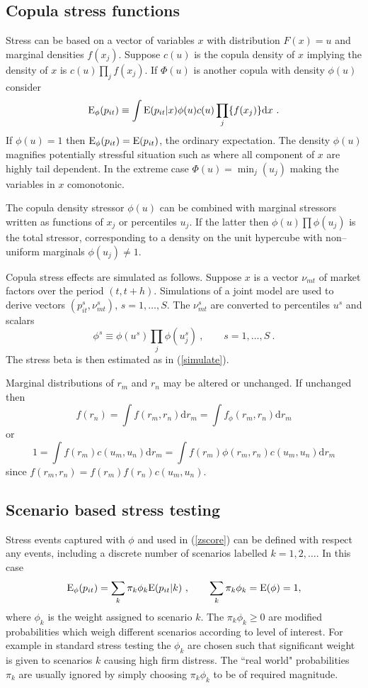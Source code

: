 \documentclass[authoryear]{elsarticle}
\newcommand{\E}{\mathrm{E}}
\newcommand{\de}{\mathrm{d}}
\newcommand{\eref}[1]{(\ref{#1})}
\newcommand{\cq}{\ , \qquad}
\newcommand{\be}[1]{\begin{equation}\label{#1}}
\newcommand{\ee}{\end{equation}}
\begin{document}
\subsection{Copula stress functions}


Stress can be based on a vector of variables $x$ with distribution $F(x)=u$ and marginal densities $f(x_j)$.    Suppose $c(u)$ is the copula density of $x$ implying the density of $x$ is $c(u)\prod_jf(x_j)$.    If  $\Phi(u)$ is another copula with density $\phi(u)$ 
consider
\be{copula}
\Es(p_{it}) \equiv \int \E(p_{it}|x)\phi(u)c(u)\prod_j\{f(x_j)\}  \de x   \ .
\ee
If $\phi(u)=1$  then $\Es(p_{it})=\E(p_{it})$, the ordinary expectation.   The density $\phi(u)$ magnifies potentially stressful situation such as where all component of $x$ are highly  tail dependent.     In the extreme case  $\Phi(u)=\min_j(u_j)$ making the  variables in $x$  comonotonic. 

The copula density stressor $\phi(u)$  can be combined with marginal stressors written as functions of $x_j$ or  percentiles $u_j$.  If the latter then $\phi(u)\prod\phi(u_j)$ is the total stressor, corresponding to a density on the unit hypercube with non--uniform marginals  $\phi(u_j)\ne 1$. 
  
Copula stress effects are simulated as follows.   Suppose $x$ is a vector $\nu_{mt}$ of  market factors  over the period $(t,t+h)$.   Simulations of a joint model are  used to  derive  vectors $(p_{it}^s,\nu_{mt}^s)$, $ s=1,\ldots, S$.  The $\nu_{mt}^s$ are  converted to percentiles $u^s$ and scalars 
$$
\phi^s\equiv\phi(u^s)\prod_j\phi(u_j^s)\cq s=1,\ldots, S\ .
$$
The stress beta is then estimated as in \eref{simulate}.



   
Marginal distributions of $r_m$ and $r_n$ may be altered or unchanged. If unchanged then
$$
f(r_n) = \int f(r_m,r_n) \de r_m = \int f_\phi(r_m,r_n) \de r_m
$$
or 
$$
1 = \int f(r_m)c(u_m,u_n) \de r_m = \int f(r_m)\phi(r_m,r_n) c(u_m,u_n) \de r_m
$$
since $f(r_m,r_n)=f(r_m)f(r_n)c(u_m,u_n)$.   


 
 \subsection{Scenario based stress testing}
 Stress events captured with $\phi$ and used  in \eref{zscore}  can be defined with respect any events, including a discrete number of scenarios labelled $k=1,2, \ldots$.   In this case 
$$
\Es(p_{it})= \sum_k \pi_k\phi_k\E(p_{it}|k)\cq \sum_k\pi_k\phi_k = \E(\phi) = 1 ,
$$
where $\phi_k$ is the weight assigned to scenario $k$.   The $\pi_k\phi_k\ge 0$ are  modified  probabilities which weigh different scenarios according to level of interest.   For example in standard stress testing the $\phi_k$ are chosen such that significant weight is given to scenarios $k$ causing high  firm distress.   The ``real world" probabilities $\pi_k$ are  usually ignored by  simply choosing  $\pi_k\phi_k$ to be of  required magnitude. 
\end{document}
